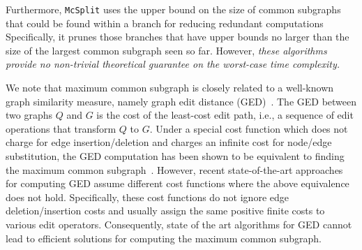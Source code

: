 {%
%
Furthermore, \texttt{McSplit} uses the 
{\chengB upper bound on the size of common subgraphs that could be found within a branch} for reducing  redundant computations  
{\chengB Specifically, it prunes} those branches that have upper bounds no larger than the size of the largest common subgraph seen so far. However, \textit{these algorithms provide no {\chengE non-trivial} theoretical guarantee on the worst-case time complexity.}
}

{
We note that maximum common subgraph is closely related to a well-known graph similarity measure, namely graph edit distance (GED)~\cite{bunke1997relation}. The GED between two graphs $Q$ and $G$ is the  cost of the  least-cost edit path, i.e., a sequence of edit operations that transform $Q$ to $G$. Under a special cost function  which does not charge for edge insertion/deletion and charges an infinite cost for node/edge substitution, the GED computation has been shown to be equivalent to finding the maximum common subgraph~\cite{bunke1997relation}. However, recent state-of-the-art approaches~\cite{chen2019efficient,gouda2016csi_ged,piao2023computing,chang2020speeding,kim2023efficient} for computing GED  assume  different cost functions where the above equivalence does not hold.  Specifically, these cost functions do not ignore edge deletion/insertion costs and usually assign the same positive finite costs to various edit operators. Consequently, state of the art algorithms for GED cannot lead to efficient solutions for computing the maximum common subgraph. 

}   



